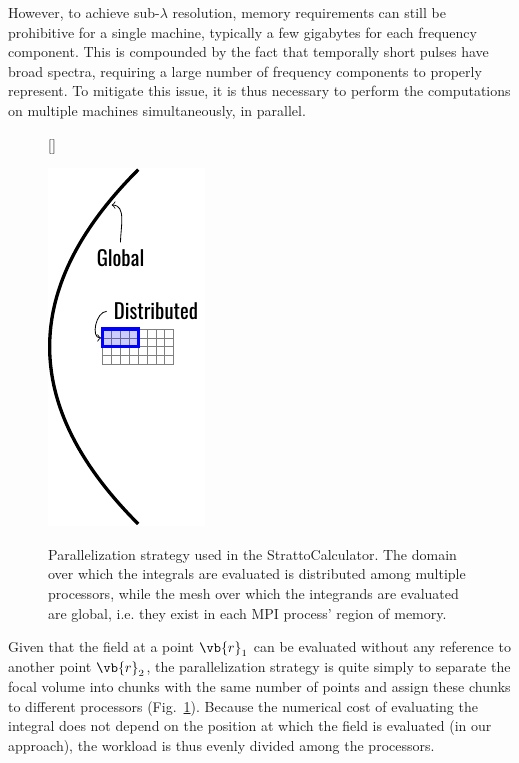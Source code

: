 \documentclass[11pt,SymmetricalJury]{inrsthesis/inrsthesis}
\begin{document}
However, to achieve sub-$\lambda$ resolution, memory requirements can still be
prohibitive for a single machine, typically a few gigabytes for each frequency
component. This is compounded by the fact that temporally short pulses have
broad spectra, requiring a large number of frequency components to properly
represent. To mitigate this issue, it is thus necessary to perform the
computations on multiple machines simultaneously, in parallel.

\begin{figure}
  \centering
  [\FBwidth]
  {\hspace{3cm}\captionsetup{width=0.4\textwidth}
  \caption[Domain decomposition strategy employed in the StrattoCalculator.]
          {Parallelization strategy used in the StrattoCalculator. The domain
          over which the integrals are evaluated is distributed among multiple
          processors, while the mesh over which the integrands are evaluated are
          global, i.e. they exist in each MPI process' region of memory.}
          \label{fig:sc.domain-decomposition}
  }
  {\includegraphics{figs/hpc-domaindecomposition.pdf}}
\end{figure}

Given that the field at a point $\vb{r}_1$ can be evaluated without any
reference to another point $\vb{r}_2$, the parallelization strategy is quite
simply to separate the focal volume into chunks with the same number of points
and assign these chunks to different processors
(Fig.~\ref{fig:sc.domain-decomposition}). Because the numerical cost of
evaluating the integral does not depend on the position at which the field is
evaluated (in our approach), the workload is thus evenly divided among the
processors.
\end{document}
